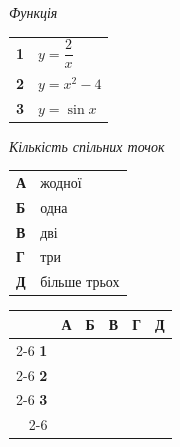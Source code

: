 \documentclass[14pt]{extarticle}
\newcommand{\answerGrid}{
    \begingroup
    \renewcommand{\arraystretch}{1.3} 
    \setlength{\tabcolsep}{7pt} 
    \begin{tabular}{r|c|c|c|c|c|}
         \multicolumn{1}{c}{} & \multicolumn{1}{c}{\textbf{А}} & \multicolumn{1}{c}{\textbf{Б}} & \multicolumn{1}{c}{\textbf{В}} & \multicolumn{1}{c}{\textbf{Г}} & \multicolumn{1}{c}{\textbf{Д}} \\ \cline{2-6}
         \textbf{1} & & & & & \\ \cline{2-6}
         \textbf{2} & & & & & \\ \cline{2-6}
         \textbf{3} & & & & & \\ \cline{2-6}
    \end{tabular}
    \endgroup
}
\newcommand{\matchingLayout}[3]{
    \noindent
    \begin{minipage}[t]{0.40\textwidth}
       
        #1
    \end{minipage}%
    \hfill
    \begin{minipage}[t]{0.28\textwidth}
        
        #2
    \end{minipage}%
    \hfill
    \begin{minipage}[t]{0.30\textwidth}
        \vspace{0pt} %
        \begin{flushright}
        #3
        \end{flushright}
    \end{minipage}
}
\begin{document}
\matchingLayout{
    \textit{Функція} \par \vspace{0.2cm}
    \begin{tabular}{@{}p{0.5cm} l@{}}
    \textbf{1} & $y=\dfrac{2}{x}$ \\[0.6cm]
    \textbf{2} & $y=x^2-4$ \\[0.4cm]
    \textbf{3} & $y=\sin x$ \\
    \end{tabular}
}{
    \textit{Кількість спільних точок} \par \vspace{0.2cm}
    \begin{tabular}{@{}p{0.5cm} l@{}}
    \textbf{А} & жодної \\[0.4cm]
    \textbf{Б} & одна \\[0.4cm]
    \textbf{В} & дві \\[0.4cm]
    \textbf{Г} & три \\[0.4cm]
    \textbf{Д} & більше трьох \\
    \end{tabular}
}{
    \answerGrid
}

\vspace{0.7cm}
\end{document}
